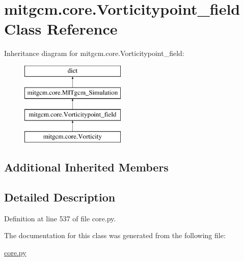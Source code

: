 \hypertarget{classmitgcm_1_1core_1_1Vorticitypoint__field}{\section{mitgcm.\+core.\+Vorticitypoint\+\_\+field Class Reference}
\label{classmitgcm_1_1core_1_1Vorticitypoint__field}
}
Inheritance diagram for mitgcm.\+core.\+Vorticitypoint\+\_\+field\+:\begin{figure}[H]
\begin{center}
\leavevmode
\includegraphics[height=4.000000cm]{classmitgcm_1_1core_1_1Vorticitypoint__field}
\end{center}
\end{figure}
\subsection*{Additional Inherited Members}


\subsection{Detailed Description}


Definition at line 537 of file core.\+py.



The documentation for this class was generated from the following file\+:\begin{DoxyCompactItemize}
\item 
\hyperlink{core_8py}{core.\+py}\end{DoxyCompactItemize}
